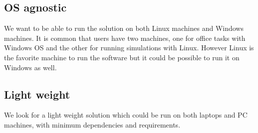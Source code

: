 \subsection{OS agnostic}
We want to be able to run the solution on both Linux machines and Windows machines. It is common that users have
two machines, one for office tasks with Windows OS and the other for running simulations with Linux. However Linux
is the favorite machine to run the software but it could be possible to run it on Windows as well.

\subsection{Light weight}
We look for a light weight solution which could be run on both laptops and PC machines, with minimum dependencies
and requirements.

